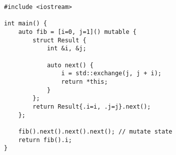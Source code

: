 \begin{lstlisting}[title=\href{https://godbolt.org/z/3ziLSW}{\texttt{godbolt.org/z/3ziLSW}}]
#include <iostream>

int main() {
    auto fib = [i=0, j=1]() mutable {
        struct Result {
            int &i, &j;

            auto next() {
                i = std::exchange(j, j + i);
                return *this;
            }
        };
        return Result{.i=i, .j=j}.next();
    };

    fib().next().next().next(); // mutate state
    return fib().i;
}
\end{lstlisting}
